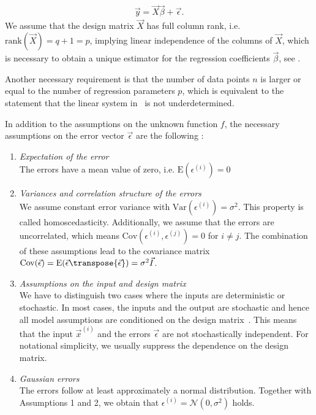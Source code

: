 \begin{align} \label{eq:LinearModel}
	\vec{y} = \vec{X}\vec{\beta} + \vec{\epsilon}.
\end{align}
%
We assume that the design matrix $\vec{X}$ has full column rank, i.e. $\mathrm{rank}(\vec{X}) = q + 1 = p$, implying linear independence of the columns of $\vec{X}$, which is necessary to obtain a unique estimator for the regression coefficients $\vec{\beta}$, see \cite{fahrmeir2007regression}.

Another necessary requirement is that the number of data points $n$ is larger or equal to the number of regression parameters $p$, which is equivalent to the statement that the linear system in~ is not underdetermined.

In addition to the assumptions on the unknown function $f$, the necessary assumptions on the error vector $\vec{\epsilon}$ are the following \cite{fahrmeir2007regression}:

\begin{enumerate}
	\item \emph{Expectation of the error} \\
	The errors have a mean value of zero, i.e. $\text{E}(\epsilon^{(i)}) = 0$

	\item \emph{Variances and correlation structure of the errors} \\
	We assume constant error variance with $\text{Var} (\epsilon^{(i)}) = \sigma^2$. This property is called homoscedasticity. Additionally, we assume that the errors are uncorrelated, which means $\text{Cov} (\epsilon^{(i)}, \epsilon^{(j)}) = 0$ for $i \ne j$. The combination of these assumptions lead to the covariance matrix $\text{Cov}(\vec{\epsilon}) = \text{E} (\vec{\epsilon} \transpose{\vec{\epsilon}}) = \sigma^2 \vec{I}$.
	
	\item \emph{Assumptions on the input and design matrix} \\
	We have to distinguish two cases where the inputs are deterministic or stochastic. In most cases, the inputs and the output are stochastic and hence all model assumptions are conditioned on the design matrix~. This means that the input $\vec{x}^{(i)}$ and the errors $\vec{\epsilon}$ are not stochastically independent. For notational simplicity, we usually suppress the dependence on the design matrix.

	\item \emph{Gaussian errors} \\
	The errors follow at least approximately a normal distribution. Together with Assumptions 1 and 2, we obtain that $\epsilon^{(i)} = \mathcal N(0, \sigma^2)$ holds. 
\end{enumerate}


